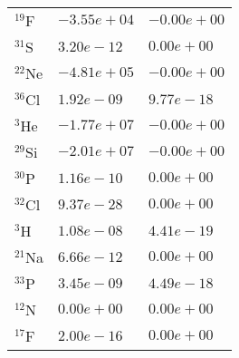 \begin{tabular}{lll}
 $^{19}$F  & $-3.55e+04 $                                                       & $-0.00e+00 $                                                                    \\
 $^{31}$S  & $3.20e-12 $                                                        & $0.00e+00 $                                                                     \\
 $^{22}$Ne & $-4.81e+05 $                                                       & $-0.00e+00 $                                                                    \\
 $^{36}$Cl & $1.92e-09 $                                                        & $9.77e-18 $                                                                     \\
 $^{3}$He  & $-1.77e+07 $                                                       & $-0.00e+00 $                                                                    \\
 $^{29}$Si & $-2.01e+07 $                                                       & $-0.00e+00 $                                                                    \\
 $^{30}$P  & $1.16e-10 $                                                        & $0.00e+00 $                                                                     \\
 $^{32}$Cl & $9.37e-28 $                                                        & $0.00e+00 $                                                                     \\
 $^{3}$H   & $1.08e-08 $                                                        & $4.41e-19 $                                                                     \\
 $^{21}$Na & $6.66e-12 $                                                        & $0.00e+00 $                                                                     \\
 $^{33}$P  & $3.45e-09 $                                                        & $4.49e-18 $                                                                     \\
 $^{12}$N  & $0.00e+00 $                                                        & $0.00e+00 $                                                                     \\
 $^{17}$F  & $2.00e-16 $                                                        & $0.00e+00 $                                                                     \\

\end{tabular}
